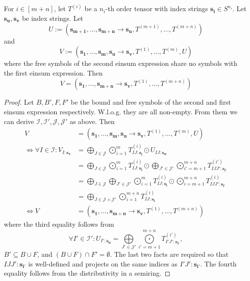 \begin{theorem}
    \label{thm:nested_einsum:1}

    For $i \in [m + n]$, let $T^{(i)}$ be a $n_i$-th order tensor with index strings $\bm{s_i} \in S^{n_i}$.
    Let $\bm{s_u}, \bm{s_v}$ be index strings.
    Let
    $$U := (\bm{s_{m + 1}},\dots,\bm{s_{m + n}} \rightarrow \bm{s_u}, T^{(m + 1)},\dots,T^{(m + n)})$$
    and
    $$V := (\bm{s_1},\dots,\bm{s_m}, \bm{s_u} \rightarrow \bm{s_v}, T^{(1)},\dots,T^{(m)}, U)$$
    where the free symbols of the second einsum expression share no symbols with the first einsum expression.
    Then
    $$V = (\bm{s_1}, \dots, \bm{s_{m + n}} \rightarrow \bm{s_v}, T^{(1)}, \dots, T^{(m + n)})$$
\end{theorem}
\begin{proof}
    Let $B, B', F, F'$ be the bound and free symbols of the second and first einsum expression respectively.
    W.l.o.g. they are all non-empty.
    From them we can derive $\mathcal{I}, \mathcal{I}', \mathcal{J}, \mathcal{J}'$ as above.
    Then
    \begin{align*}
        V                                               & = (\bm{s_1},\dots,\bm{s_m}, \bm{s_u} \rightarrow \bm{s_v}, T^{(1)},\dots,T^{(m)}, U)                                                                                                                   \\
        \iff \forall I \in \mathcal{I}: V_{I: \bm{s_v}} & = \bigoplus\limits_{J \in \mathcal{J}} \bigodot\limits_{i = 1}^{m} T^{(i)}_{IJ:\bm{s_i}} \odot U_{IJ:\bm{s_u}}                                                                                         \\
                                                        & = \bigoplus\limits_{J \in \mathcal{J}} \bigodot\limits_{i = 1}^{m} T^{(i)}_{IJ:\bm{s_i}} \odot \bigoplus\limits_{J' \in \mathcal{J}'} \bigodot\limits_{i' = m + 1}^{m + n} T^{(i')}_{IJJ':\bm{s_{i'}}} \\
                                                        & = \bigoplus\limits_{J \in \mathcal{J}} \bigoplus\limits_{J' \in \mathcal{J}'} \bigodot\limits_{i = 1}^{m} T^{(i)}_{IJ:\bm{s_i}} \odot \bigodot\limits_{i = m + 1}^{m + n} T^{(i)}_{IJJ':\bm{s_{i'}}}   \\
                                                        & = \bigoplus\limits_{J \in \mathcal{J} \times \mathcal{J}'} \bigodot\limits_{i = 1}^{m + n} T^{(i)}_{IJ:\bm{s_i}}                                                                                       \\
        \iff V                                          & = (\bm{s_1}, \dots, \bm{s_{m + n}} \rightarrow \bm{s_v}, T^{(1)}, \dots, T^{(m + n)})
    \end{align*}
    where the third equality follows from
    $$\forall I' \in \mathcal{I}': U_{I': \bm{s_u}} = \bigoplus\limits_{J' \in \mathcal{J}'} \bigodot\limits_{i' = m + 1}^{m + n} T^{(i')}_{I'J':\bm{s_{i'}}},$$
    $B' \subseteq B \cup F$, and $(B \cup F) \cap F' = \emptyset$. The last two facts are required so that $IJJ':\bm{s_{i'}}$ is well-defined and projects on the same indices as $I'J':\bm{s_{i'}}$.
    The fourth equality follows from the distributivity in a semiring.
\end{proof}

